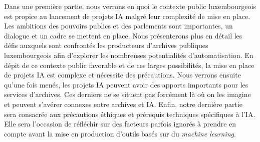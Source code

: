 Dans une première partie, nous verrons en quoi le contexte public
luxembourgeois est propice au lancement de projets IA malgré leur
complexité de mise en place. Les ambitions des pouvoirs publics et des
parlements sont importantes, un dialogue et un cadre se mettent en
place. Nous présenterons plus en détail les défis auxquels sont
confrontés les producteurs d'archives publiques luxembourgeois afin
d'explorer les nombreuses potentialités d'automatisation. En dépit de ce
contexte public favorable et de ces larges possibilités, la mise en
place de projets IA est complexe et nécessite des précautions.
Nous verrons ensuite qu'une fois menés, les projets IA 
peuvent avoir des apports importants pour les services d'archives. 
Ces derniers ne se situent pas forcément là où on les imagine et 
peuvent s'avérer connexes entre archives et IA.
Enfin, notre dernière partie sera consacrée aux précautions éthiques et prérequis
techniques spécifiques à l'IA. Elle sera l'occasion de réfléchir sur
des facteurs parfois ignorés à prendre en compte avant la mise en production d'outils basés sur du \emph{machine learning}.

